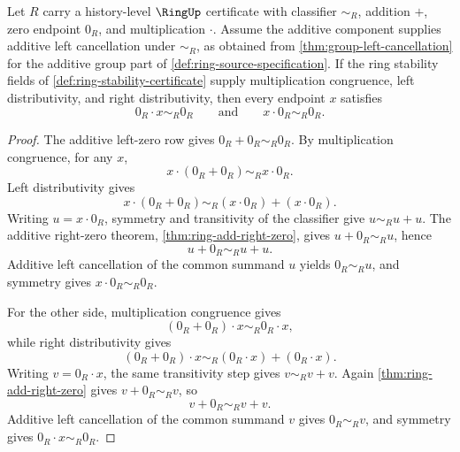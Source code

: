\begin{theorem}
\label{thm:ring-zero-absorption-from-distributivity}
Let $R$ carry a history-level $\RingUp$ certificate with classifier $\sim_R$, addition $+$, zero endpoint $0_R$, and multiplication $\cdot$. Assume the additive component supplies additive left cancellation under $\sim_R$, as obtained from \autoref{thm:group-left-cancellation} for the additive group part of \autoref{def:ring-source-specification}. If the ring stability fields of \autoref{def:ring-stability-certificate} supply multiplication congruence, left distributivity, and right distributivity, then every endpoint $x$ satisfies
$$
0_R\cdot x\sim_R0_R\qquad\text{and}\qquad x\cdot0_R\sim_R0_R.
$$
\end{theorem}
\begin{proof}
The additive left-zero row gives $0_R+0_R\sim_R0_R$. By multiplication congruence, for any $x$,
$$
x\cdot(0_R+0_R)\sim_Rx\cdot0_R.
$$
Left distributivity gives
$$
x\cdot(0_R+0_R)\sim_R(x\cdot0_R)+(x\cdot0_R).
$$
Writing $u=x\cdot0_R$, symmetry and transitivity of the classifier give $u\sim_Ru+u$. The additive right-zero theorem, \autoref{thm:ring-add-right-zero}, gives $u+0_R\sim_Ru$, hence
$$
u+0_R\sim_Ru+u.
$$
Additive left cancellation of the common summand $u$ yields $0_R\sim_Ru$, and symmetry gives $x\cdot0_R\sim_R0_R$.

For the other side, multiplication congruence gives
$$
(0_R+0_R)\cdot x\sim_R0_R\cdot x,
$$
while right distributivity gives
$$
(0_R+0_R)\cdot x\sim_R(0_R\cdot x)+(0_R\cdot x).
$$
Writing $v=0_R\cdot x$, the same transitivity step gives $v\sim_Rv+v$. Again \autoref{thm:ring-add-right-zero} gives $v+0_R\sim_Rv$, so
$$
v+0_R\sim_Rv+v.
$$
Additive left cancellation of the common summand $v$ gives $0_R\sim_Rv$, and symmetry gives $0_R\cdot x\sim_R0_R$.
\end{proof}

